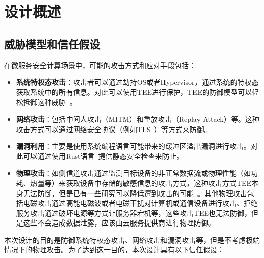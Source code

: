 \section{设计概述}\label{sec:overview}

\subsection{威胁模型和信任假设}\label{subsec:threat-model}

在微服务安全计算场景中，可能的攻击方式和应对手段包括：

\begin{itemize}
    \item \textbf{系统特权态攻击}：攻击者可以通过劫持OS或者Hypervisor，通过系统的特权态获取系统中的所有信息。对此可以使用TEE进行保护，TEE的防御模型可以轻松抵御这种威胁~\cite{costan2016intel}。
    \item \textbf{网络攻击}：包括中间人攻击（MITM）和重放攻击（Replay Attack）等。这种攻击方式可以通过网络安全协议（例如TLS~\cite{8446}）等方式来防御。
    \item \textbf{漏洞利用}：主要是使用系统编程语言可能带来的缓冲区溢出漏洞进行攻击。对此可以通过使用Rust语言~\cite{rust-lang}提供静态安全检查来防止。
    \item \textbf{物理攻击}：如侧信道攻击通过监测目标设备的非正常数据流或物理性能（如功耗、热量等）来获取设备中存储的敏感信息的攻击方式，这种攻击方式TEE本身无法防御，但是已有一些研究可以降低遭到攻击的可能~\cite{oleksenko2018varys}。其他物理攻击包括电磁攻击通过高能电磁波或者电磁干扰对计算机或通信设备进行攻击、拒绝服务攻击通过破坏电源等方式让服务器宕机等，这些攻击TEE也无法防御，但是这些不会造成数据泄露，应该由云服务提供商进行物理防御。
\end{itemize}

本次设计的目的是防御系统特权态攻击、网络攻击和漏洞攻击等，但是不考虑极端情况下的物理攻击。为了达到这一目的，本次设计具有以下信任假设：

